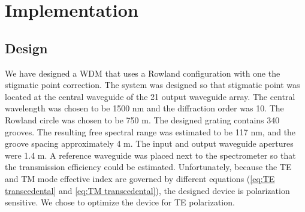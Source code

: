 \documentclass[12pt,twoside,english]{book}
\renewcommand{\~}{\perispomeni}%
\DeclareRobustCommand{\textgreek}[1]{\leavevmode{\greektext #1}}
\numberwithin{equation}{section}
\numberwithin{figure}{section}
\begin{document}
\section{Implementation}
\label{section:implementation}




\subsection{Design}
We have designed a \gls{WDM} that uses a Rowland configuration with one the stigmatic point correction. The system was designed so that stigmatic point was located at the central waveguide of the 21 output waveguide array. The central wavelength was chosen to be 1500 nm and the diffraction order was 10. The Rowland circle was chosen to be 750 \textgreek{m}m. The designed grating contains 340 grooves. The resulting free spectral range was estimated to be 117 nm, and the groove spacing approximately 4 \textgreek{m}m. The input and output waveguide apertures were 1.4 \textgreek{m}m. A reference waveguide was placed next to the spectrometer so that the transmission efficiency could be estimated. Unfortunately, because the TE and TM mode effective index are governed by different equations (\ref{eq:TE transcedental} and \ref{eq:TM transcedental}), the designed device is polarization sensitive. We chose to optimize the device for TE polarization.
\end{document}
